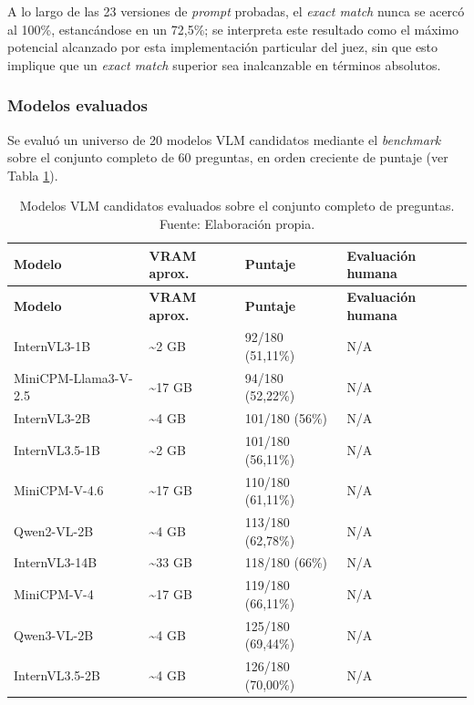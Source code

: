 A lo largo de las 23 versiones de \textit{prompt} probadas, el \textit{exact match} nunca se acercó al 100\%, estancándose en un 72,5\%; se interpreta este resultado como el máximo potencial alcanzado por esta implementación particular del juez, sin que esto implique que un \textit{exact match} superior sea inalcanzable en términos absolutos. 

\subsubsection{Modelos evaluados}

Se evaluó un universo de 20 modelos VLM candidatos mediante el \textit{benchmark} sobre el conjunto completo de 60 preguntas, en orden creciente de puntaje (ver Tabla \ref{table:modelosvlm}).

\begin{longtable}{|p{3.6cm}|p{2.2cm}|p{3.6cm}|p{3.2cm}|}
    \caption{\label{table:modelosvlm}Modelos VLM candidatos evaluados sobre el conjunto completo de preguntas. Fuente: Elaboración propia.} \\
    \hline
    \textbf{Modelo} & \textbf{VRAM aprox.} & \textbf{Puntaje} & \textbf{Evaluación humana} \\
    \hline
    \endfirsthead
    \hline
    \textbf{Modelo} & \textbf{VRAM aprox.} & \textbf{Puntaje} & \textbf{Evaluación humana} \\
    \hline
    \endhead
    InternVL3-1B & \textasciitilde{}2 GB & 92/180 (51,11\%) & N/A \\
    \hline
    MiniCPM-Llama3-V-2.5 & \textasciitilde{}17 GB & 94/180 (52,22\%) & N/A \\
    \hline
    InternVL3-2B & \textasciitilde{}4 GB & 101/180 (56\%) & N/A \\
    \hline
    InternVL3.5-1B & \textasciitilde{}2 GB & 101/180 (56,11\%) & N/A \\
    \hline
    MiniCPM-V-4.6 & \textasciitilde{}17 GB & 110/180 (61,11\%) & N/A \\
    \hline
    Qwen2-VL-2B & \textasciitilde{}4 GB & 113/180 (62,78\%) & N/A \\
    \hline
    InternVL3-14B & \textasciitilde{}33 GB & 118/180 (66\%) & N/A \\
    \hline
    MiniCPM-V-4 & \textasciitilde{}17 GB & 119/180 (66,11\%) & N/A \\
    \hline
    Qwen3-VL-2B & \textasciitilde{}4 GB & 125/180 (69,44\%) & N/A \\
    \hline
    InternVL3.5-2B & \textasciitilde{}4 GB & 126/180 (70,00\%) & N/A \\

\end{longtable}
